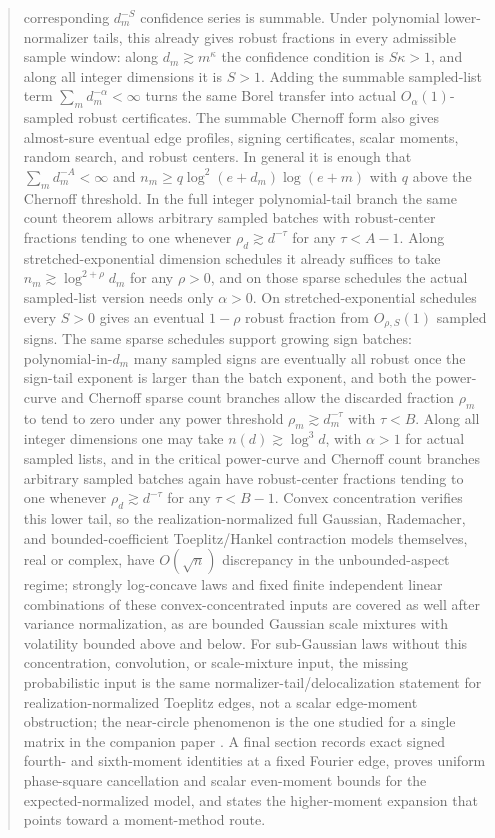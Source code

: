 \documentclass[11pt]{amsart}
\numberwithin{equation}{section}
\theoremstyle{definition}
\theoremstyle{remark}
\begin{document}
\begin{abstract}
corresponding \(d_m^{-S}\) confidence series is summable.  Under polynomial
lower-normalizer tails, this already gives robust fractions in every admissible
sample window: along \(d_m\gtrsim m^\kappa\) the confidence condition is
\(S\kappa>1\), and along all integer dimensions it is \(S>1\).  Adding the summable
sampled-list term \(\sum_m d_m^{-\alpha}<\infty\) turns the same Borel
transfer into actual \(O_\alpha(1)\)-sampled robust certificates.  The summable
Chernoff form also gives almost-sure eventual edge profiles, signing
certificates, scalar moments, random search, and robust centers.  In general it
is enough that \(\sum_m d_m^{-A}<\infty\) and
\(n_m\ge q\log^2(e+d_m)\log(e+m)\) with \(q\) above the Chernoff threshold.
In the full integer polynomial-tail branch the same count theorem allows
arbitrary sampled batches with robust-center fractions tending to one whenever
\(\rho_d\gtrsim d^{-\tau}\) for any \(\tau<A-1\).
Along stretched-exponential dimension schedules it already suffices to take
\(n_m\gtrsim\log^{2+\rho}d_m\) for any \(\rho>0\), and on those sparse
schedules the actual sampled-list version needs only \(\alpha>0\).  On stretched-exponential
schedules every \(S>0\) gives an eventual \(1-\rho\) robust fraction from
\(O_{\rho,S}(1)\) sampled signs.  The same sparse schedules support growing
sign batches: polynomial-in-\(d_m\) many
sampled signs are eventually all robust once the sign-tail exponent is larger
than the batch exponent, and both the power-curve and Chernoff sparse
count branches allow the discarded fraction \(\rho_m\) to tend to zero under
any power threshold \(\rho_m\gtrsim d_m^{-\tau}\) with \(\tau<B\).  Along all integer dimensions one may take
\(n(d)\gtrsim\log^3 d\), with \(\alpha>1\) for actual sampled lists, and in
the critical power-curve and Chernoff count branches arbitrary sampled batches
again have robust-center fractions tending to one whenever
\(\rho_d\gtrsim d^{-\tau}\) for any \(\tau<B-1\).
Convex concentration
verifies this lower tail, so the
realization-normalized full Gaussian, Rademacher, and bounded-coefficient
Toeplitz/Hankel contraction models themselves, real or complex, have
\(O(\sqrt n)\) discrepancy in the unbounded-aspect regime; strongly
log-concave laws and fixed finite independent linear combinations of these
convex-concentrated inputs are covered as well after variance normalization, as
are bounded Gaussian scale mixtures with volatility bounded above and below.
For sub-Gaussian laws without this concentration, convolution, or
scale-mixture input, the missing probabilistic input is the same
normalizer-tail/delocalization statement for realization-normalized Toeplitz
edges, not a scalar edge-moment obstruction; the near-circle phenomenon is the
one studied for a single matrix in the companion
paper \cite{Shmalo-paper5}. A final section records exact signed fourth- and
sixth-moment identities at a fixed Fourier edge, proves uniform phase-square
cancellation and scalar even-moment bounds for the expected-normalized model,
and states the higher-moment expansion that points toward a moment-method route.
\end{abstract}
\end{document}
